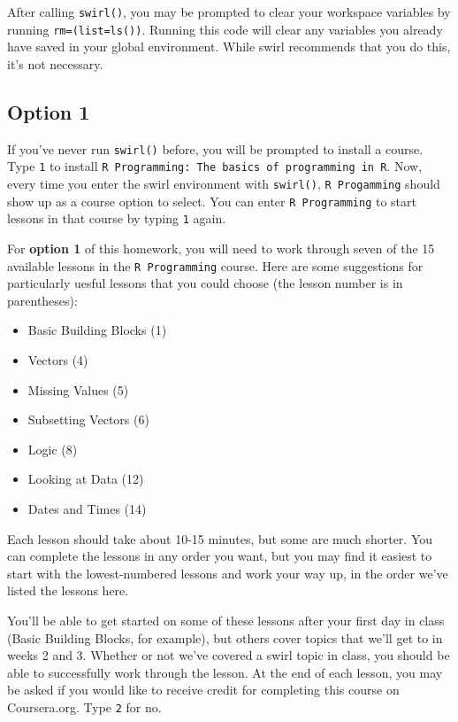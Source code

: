 \documentclass[]{book}
\makeatletter
\providecommand{\tightlist}{%
  \setlength{\itemsep}{0pt}\setlength{\parskip}{0pt}}
\newenvironment{kframe}{%
\medskip{}
\setlength{\fboxsep}{.8em}
 \def\at@end@of@kframe{}%
 \ifinner\ifhmode%
  \def\at@end@of@kframe{\end{minipage}}%
  \begin{minipage}{\columnwidth}%
 \fi\fi%
 \def\FrameCommand##1{\hskip\@totalleftmargin \hskip-\fboxsep
 \colorbox{shadecolor}{##1}\hskip-\fboxsep
     \hskip-\linewidth \hskip-\@totalleftmargin \hskip\columnwidth}%
 \MakeFramed {\advance\hsize-\width
   \@totalleftmargin\z@ \linewidth\hsize
   \@setminipage}}%
 {\par\unskip\endMakeFramed%
 \at@end@of@kframe}
\newenvironment{rmdblock}[1]
  {
  \begin{itemize}
  \renewcommand{\labelitemi}{
    \raisebox{-.7\height}[0pt][0pt]{
      {\setkeys{Gin}{width=3em,keepaspectratio}\texttt{[image: images/\#1]}}
    }
  }
  \setlength{\fboxsep}{1em}
  \begin{kframe}
  \item
  }
  {
  \end{kframe}
  \end{itemize}
  }
\newenvironment{rmdnote}
  {\begin{rmdblock}{note}}
  {\end{rmdblock}}
\theoremstyle{definition}
\theoremstyle{definition}
\theoremstyle{definition}
\theoremstyle{remark}
\makeatother
\begin{document}
\begin{rmdnote}
After calling \texttt{swirl()}, you may be prompted to clear your
workspace variables by running \texttt{rm=(list=ls())}. Running this
code will clear any variables you already have saved in your global
environment. While swirl recommends that you do this, it's not
necessary.
\end{rmdnote}

\subsection{Option 1}\label{option-1}

If you've never run \texttt{swirl()} before, you will be prompted to
install a course. Type \texttt{1} to install
\texttt{R\ Programming:\ The\ basics\ of\ programming\ in\ R}. Now,
every time you enter the swirl environment with \texttt{swirl()},
\texttt{R\ Progamming} should show up as a course option to select. You
can enter \texttt{R\ Programming} to start lessons in that course by
typing \texttt{1} again.

For \textbf{option 1} of this homework, you will need to work through
seven of the 15 available lessons in the \texttt{R\ Programming} course.
Here are some suggestions for particularly uesful lessons that you could
choose (the lesson number is in parentheses):

\begin{itemize}
\tightlist
\item
  Basic Building Blocks (1)
\item
  Vectors (4)
\item
  Missing Values (5)
\item
  Subsetting Vectors (6)
\item
  Logic (8)
\item
  Looking at Data (12)
\item
  Dates and Times (14)
\end{itemize}

Each lesson should take about 10-15 minutes, but some are much shorter.
You can complete the lessons in any order you want, but you may find it
easiest to start with the lowest-numbered lessons and work your way up,
in the order we've listed the lessons here.

You'll be able to get started on some of these lessons after your first
day in class (Basic Building Blocks, for example), but others cover
topics that we'll get to in weeks 2 and 3. Whether or not we've covered
a swirl topic in class, you should be able to successfully work through
the lesson. At the end of each lesson, you may be asked if you would
like to receive credit for completing this course on Coursera.org. Type
\texttt{2} for no.
\end{document}
